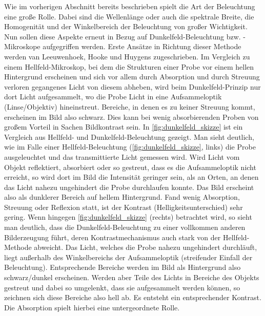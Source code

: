 \documentclass[ngerman]{scrartcl}
\begin{document}
Wie im vorherigen Abschnitt bereits beschrieben spielt die Art der Beleuchtung eine große Rolle. Dabei sind die Wellenlänge oder auch die spektrale Breite, die Homogenität und der Winkelbereich der Beleuchtung von großer Wichtigkeit. Nun sollen diese Aspekte erneut in Bezug auf Dunkelfeld-Beleuchtung bzw. -Mikroskope aufgegriffen werden. Erste Ansätze in Richtung dieser Methode werden van Leeuwenhoek, Hooke und Huygens zugeschrieben. Im Vergleich zu einem Hellfeld-Mikroskop, bei dem die Strukturen einer Probe vor einem hellen Hintergrund erscheinen und sich vor allem durch Absorption und durch Streuung verloren gegangenes Licht von diesem abheben, wird beim Dunkelfeld-Prinzip nur dort Licht aufgesammelt, wo die Probe Licht in eine Aufsammeloptik (Linse/Objektiv) hineinstreut. Bereiche, in denen es zu keiner Streuung kommt, erscheinen im Bild also schwarz. Dies kann bei wenig absorbierenden Proben von großem Vorteil in Sachen Bildkontrast sein. In \autoref{fig:dunkelfeld_skizze} ist ein Vergleich aus Hellfeld- und Dunkelfeld-Beleuchtung gezeigt. Man sieht deutlich, wie im Falle einer Hellfeld-Beleuchtung (\autoref{fig:dunkelfeld_skizze}, links) die Probe ausgeleuchtet und das transmittierte Licht gemessen wird. Wird Licht vom Objekt reflektiert, absorbiert oder so gestreut, dass es die Aufsammeloptik nicht erreicht, so wird dort im Bild die Intensität geringer sein, als an Orten, an denen das Licht nahezu ungehindert die Probe durchlaufen konnte. Das Bild erscheint also als dunklerer Bereich auf hellem Hintergrund. Fand wenig Absorption, Streuung oder Reflexion statt, ist der Kontrast (Helligkeitsunterschied) sehr gering. Wenn hingegen \autoref{fig:dunkelfeld_skizze} (rechts) betrachtet wird, so sieht man deutlich, dass die Dunkelfeld-Beleuchtung zu einer vollkommen anderen Bilderzeugung führt, deren Kontrastmechanismus auch stark von der Hellfeld-Methode abweicht. Das Licht, welches die Probe nahezu ungehindert durchläuft, liegt außerhalb des Winkelbereichs der Aufsammeloptik (streifender Einfall der Beleuchtung). Entsprechende Bereiche werden im Bild als Hintergrund also schwarz/dunkel erscheinen. Werden aber Teile des Lichts in Bereiche des Objekts gestreut und dabei so umgelenkt, dass sie aufgesammelt werden können, so zeichnen sich diese Bereiche also hell ab. Es entsteht ein entsprechender Kontrast. Die Absorption spielt hierbei eine untergeordnete Rolle.
%
\end{document}
